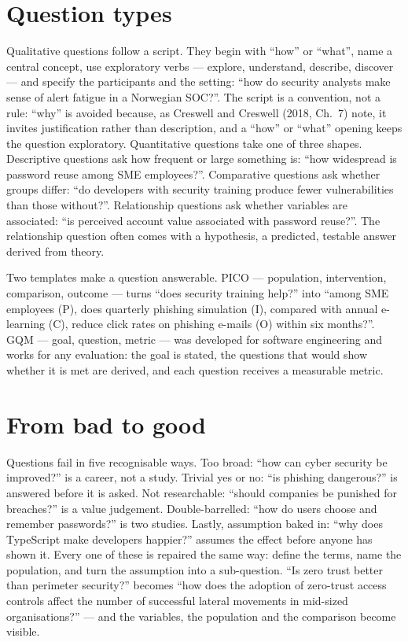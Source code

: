 \documentclass[11pt,a4paper,british,twoside=false,headings=small,chapterprefix=false,numbers=noenddot]{scrbook}
\begin{document}
\section{Question types}

Qualitative questions follow a script. They begin with ``how'' or ``what'', name a central concept, use exploratory verbs --- explore, understand, describe, discover --- and specify the participants and the setting: ``how do security analysts make sense of alert fatigue in a Norwegian SOC?''. The script is a convention, not a rule: ``why'' is avoided because, as Creswell and Creswell (2018, Ch.\ 7) note, it invites justification rather than description, and a ``how'' or ``what'' opening keeps the question exploratory. Quantitative questions take one of three shapes. Descriptive questions ask how frequent or large something is: ``how widespread is password reuse among SME employees?''. Comparative questions ask whether groups differ: ``do developers with security training produce fewer vulnerabilities than those without?''. Relationship questions ask whether variables are associated: ``is perceived account value associated with password reuse?''. The relationship question often comes with a hypothesis, a predicted, testable answer derived from theory.

Two templates make a question answerable. PICO --- population, intervention, comparison, outcome --- turns ``does security training help?'' into ``among SME employees (P), does quarterly phishing simulation (I), compared with annual e-learning (C), reduce click rates on phishing e-mails (O) within six months?''. GQM --- goal, question, metric --- was developed for software engineering and works for any evaluation: the goal is stated, the questions that would show whether it is met are derived, and each question receives a measurable metric.

\section{From bad to good}

Questions fail in five recognisable ways. Too broad: ``how can cyber security be improved?'' is a career, not a study. Trivial yes or no: ``is phishing dangerous?'' is answered before it is asked. Not researchable: ``should companies be punished for breaches?'' is a value judgement. Double-barrelled: ``how do users choose and remember passwords?'' is two studies. Lastly, assumption baked in: ``why does TypeScript make developers happier?'' assumes the effect before anyone has shown it. Every one of these is repaired the same way: define the terms, name the population, and turn the assumption into a sub-question. ``Is zero trust better than perimeter security?'' becomes ``how does the adoption of zero-trust access controls affect the number of successful lateral movements in mid-sized organisations?'' --- and the variables, the population and the comparison become visible.
\end{document}
